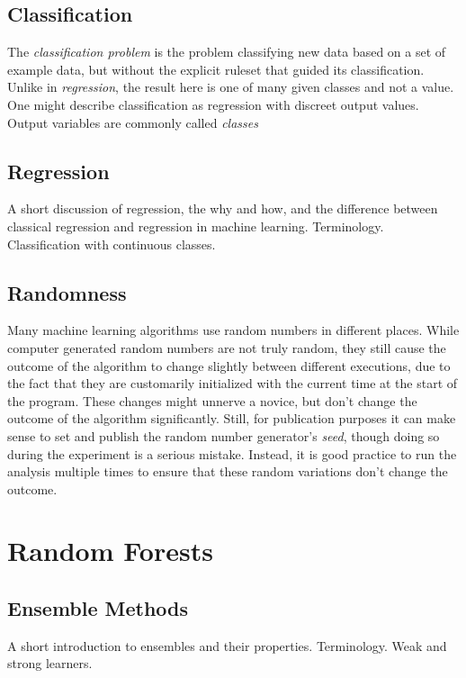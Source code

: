 \documentclass[a4paper,man,12pt,apacite]{apa6} %
\begin{document}
\subsection{Classification}
The \emph{classification problem} is the problem classifying new data based
on a set of example data, but without the explicit ruleset that guided its
classification.
Unlike in \emph{regression}, the result here is one of many given classes
and not a value.
One might describe classification as regression with discreet output values.
Output variables are commonly called \emph{classes}

\subsection{Regression}
A short discussion of regression, the why and how, and the difference
between classical regression and regression in machine learning.
Terminology. Classification with continuous classes.

\subsection{Randomness}
Many machine learning algorithms use random numbers in different places.
While computer generated random numbers are not truly random, they still
cause the outcome of the algorithm to change slightly between different
executions, due to the fact that they are customarily initialized with
the current time at the start of the program.
These changes might unnerve a novice, but don't change the outcome of the
algorithm significantly.
Still, for publication purposes it can make sense to set and publish the
random number generator's \emph{seed}, though doing so during the experiment
is a serious mistake.
Instead, it is good practice to run the analysis multiple times to ensure
that these random variations don't change the outcome.

\section{Random Forests}

\subsection{Ensemble Methods}
A short introduction to ensembles and their properties. Terminology.
Weak and strong learners. \cite{dietterich2000experimental}
\cite{bauer1999empirical}
\end{document}
